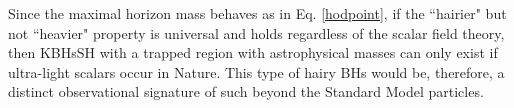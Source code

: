 \bigskip

Since the maximal horizon mass behaves as in Eq. \eqref{hodpoint}, if the ``hairier" but not ``heavier" property is universal and holds regardless of the scalar field theory, then KBHsSH with a trapped region with astrophysical masses can only exist if ultra-light scalars occur in Nature. This type of hairy BHs would be, therefore, a distinct observational signature of such beyond the Standard Model particles.
%
%
%
%  
